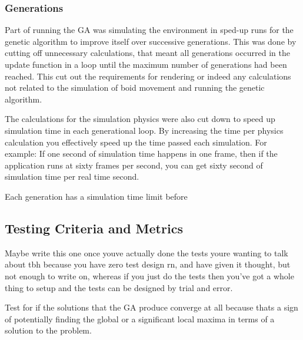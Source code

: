 \subsubsection{Generations}
Part of running the GA was simulating the environment in sped-up runs for the genetic algorithm to improve itself over successive generations. This was done by cutting off unnecessary calculations, that meant all generations occurred in the update function in a loop until the maximum number of generations had been reached. This cut out the requirements for rendering or indeed any calculations not related to the simulation of boid movement and running the genetic algorithm.

The calculations for the simulation physics were also cut down to speed up simulation time in each generational loop. By increasing the time per physics calculation you effectively speed up the time passed each simulation. For example: If one second of simulation time happens in one frame, then if the application runs at sixty frames per second, you can get sixty second of simulation time per real time second.

Each generation has a simulation time limit before



\subsection{Testing Criteria and Metrics}
Maybe write this one once youve actually done the tests youre wanting to talk about tbh because you have zero test design rn, and have given it thought, but not enough to write on, whereas if you just do the tests then you've got a whole thing to setup and the tests can be designed by trial and error.

Test for if the solutions that the GA produce converge at all because thats a sign of potentially finding the global or a significant local maxima in terms of a solution to the problem. 















